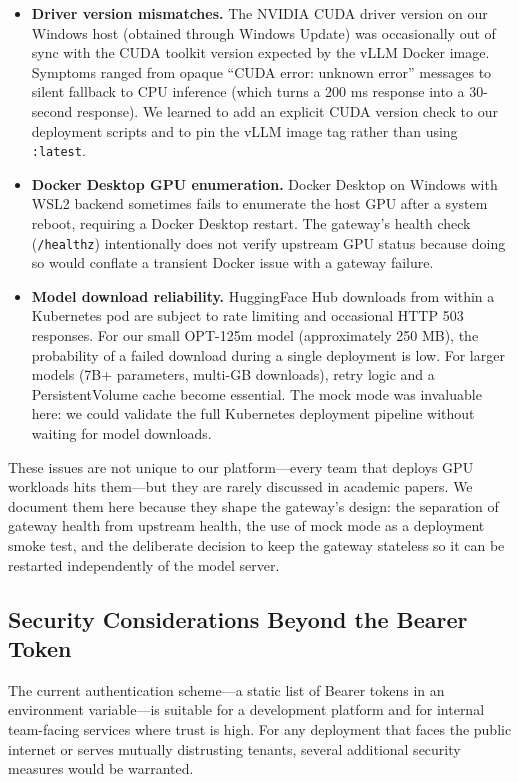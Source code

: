 \documentclass[10pt,journal]{IEEEtran}
\begin{document}
\begin{itemize}
  \item \textbf{Driver version mismatches.} The NVIDIA CUDA driver version on our Windows host (obtained through Windows Update) was occasionally out of sync with the CUDA toolkit version expected by the vLLM Docker image. Symptoms ranged from opaque ``CUDA error: unknown error'' messages to silent fallback to CPU inference (which turns a 200 ms response into a 30-second response). We learned to add an explicit CUDA version check to our deployment scripts and to pin the vLLM image tag rather than using \texttt{:latest}.
  \item \textbf{Docker Desktop GPU enumeration.} Docker Desktop on Windows with WSL2 backend sometimes fails to enumerate the host GPU after a system reboot, requiring a Docker Desktop restart. The gateway's health check (\texttt{/healthz}) intentionally does not verify upstream GPU status because doing so would conflate a transient Docker issue with a gateway failure.
  \item \textbf{Model download reliability.} HuggingFace Hub downloads from within a Kubernetes pod are subject to rate limiting and occasional HTTP 503 responses. For our small OPT-125m model (approximately 250 MB), the probability of a failed download during a single deployment is low. For larger models (7B+ parameters, multi-GB downloads), retry logic and a PersistentVolume cache become essential. The mock mode was invaluable here: we could validate the full Kubernetes deployment pipeline without waiting for model downloads.
\end{itemize}

These issues are not unique to our platform---every team that deploys GPU workloads hits them---but they are rarely discussed in academic papers. We document them here because they shape the gateway's design: the separation of gateway health from upstream health, the use of mock mode as a deployment smoke test, and the deliberate decision to keep the gateway stateless so it can be restarted independently of the model server.

\subsection{Security Considerations Beyond the Bearer Token}

The current authentication scheme---a static list of Bearer tokens in an environment variable---is suitable for a development platform and for internal team-facing services where trust is high. For any deployment that faces the public internet or serves mutually distrusting tenants, several additional security measures would be warranted.
\end{document}
